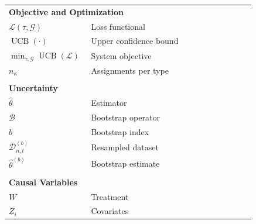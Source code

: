 \documentclass[12pt]{article}
\begin{document}
\begin{longtable}{p{0.32\linewidth} p{0.64\linewidth}}
\multicolumn{2}{l}{\textbf{Objective and Optimization}} \\
$\mathcal{L}(\tau,\mathcal{G})$ & Loss functional \\
$\operatorname{UCB}(\cdot)$ & Upper confidence bound \\
$\min_{\tau,\mathcal{G}} \operatorname{UCB}(\mathcal{L})$ & System objective \\
$n_\kappa$ & Assignments per type \\
\\[3pt]

\multicolumn{2}{l}{\textbf{Uncertainty}} \\
$\hat{\theta}$ & Estimator \\
$\mathcal{B}$ & Bootstrap operator \\
$b$ & Bootstrap index \\
$\mathcal{D}^{(b)}_{n,t}$ & Resampled dataset \\
$\hat{\theta}^{(b)}$ & Bootstrap estimate \\
\\[3pt]

\multicolumn{2}{l}{\textbf{Causal Variables}} \\
$W$ & Treatment \\
$Z_i$ & Covariates \\

\end{longtable}

\newpage
\end{document}
